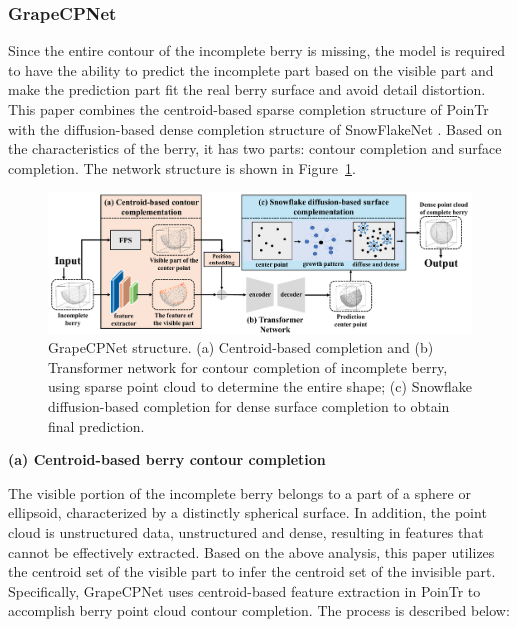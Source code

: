 \documentclass[12pt]{article}
\begin{document}
\subsubsection{GrapeCPNet}

Since the entire contour of the incomplete berry is missing, the model is required to have the ability to predict the incomplete part based on the visible part and make the prediction part fit the real berry surface and avoid detail distortion. 
This paper combines the centroid-based sparse completion structure of PoinTr \citep{yu_pointr_2021} with the diffusion-based dense completion structure of SnowFlakeNet \citep{xiang_snowflakenet_2021}. 
Based on the characteristics of the berry, it has two parts: contour completion and surface completion. The network structure is shown in Figure~\ref{fig:raw5}.

\begin{figure}[hbt!]
    \centering
    \includegraphics[width=1\textwidth]{figures/Figure10.pdf}
    \caption{GrapeCPNet structure. (a) Centroid-based completion and (b) Transformer network for contour completion of incomplete berry, using sparse point cloud to determine the entire shape; (c) Snowflake diffusion-based completion for dense surface completion to obtain final prediction.}
    \label{fig:raw5}
\end{figure}

{\raggedright\textbf{(a) Centroid-based berry contour completion}}

The visible portion of the incomplete berry belongs to a part of a sphere or ellipsoid, characterized by a distinctly spherical surface. 
In addition, the point cloud is unstructured data, unstructured and dense, resulting in features that cannot be effectively extracted. 
Based on the above analysis, this paper utilizes the centroid set of the visible part to infer the centroid set of the invisible part. 
Specifically, GrapeCPNet uses centroid-based feature extraction in PoinTr \citep{yu_pointr_2021} to accomplish berry point cloud contour completion. The process is described below: 
\end{document}
